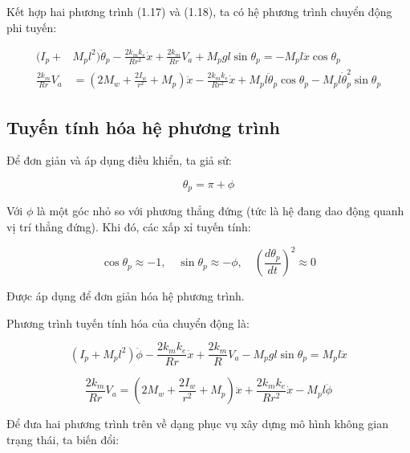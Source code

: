             Kết hợp hai phương trình (1.17) và (1.18), ta có hệ phương trình chuyển động phi tuyến:

            \begin{align}
                (I_p +& M_p l^2)  \ddot{\theta}_p - \frac{2k_m k_e}{R r^2} \dot{x} + \frac{2k_m}{R r} V_a + M_p g l \sin\theta_p = -M_p l \ddot{x} \cos\theta_p  \\
                \frac{2k_m}{R r} V_a &= \left(2 M_w + \frac{2 I_w}{r^2} + M_p \right) \ddot{x} - \frac{2k_m k_e}{R r^2} \dot{x} + M_p l \ddot{\theta}_p \cos\theta_p - M_p l \dot{\theta}_p^2 \sin\theta_p 
            \end{align}

        \subsection{Tuyến tính hóa hệ phương trình}

            \hspace*{0.6cm}Để đơn giản và áp dụng điều khiển, ta giả sử:

            \[
            \theta_p = \pi + \phi
            \]

            Với \( \phi \) là một góc nhỏ so với phương thẳng đứng (tức là hệ đang dao động quanh vị trí thẳng đứng). Khi đó, các xấp xỉ tuyến tính:

            \[
            \cos\theta_p \approx -1, \quad \sin\theta_p \approx -\phi, \quad \left( \frac{d\theta_p}{dt} \right)^2 \approx 0
            \]

            Được áp dụng để đơn giản hóa hệ phương trình.

            Phương trình tuyến tính hóa của chuyển động là:

            \begin{equation}
                (I_p + M_p l^2)\ddot{\phi} - \frac{2k_m k_e}{R r} \dot{x} + \frac{2k_m}{R} V_a - M_p g l \sin \theta_p = M_p l \ddot{x}
            \end{equation}

            \begin{equation}
                \frac{2k_m}{R r} V_a = \left( 2M_w + \frac{2I_w}{r^2} + M_p \right) \ddot{x} + \frac{2k_m k_e}{R r^2} \dot{x} - M_p l \ddot{\phi}
            \end{equation}

            Để đưa hai phương trình trên về dạng phục vụ xây dựng mô hình không gian trạng thái, ta biến đổi:

